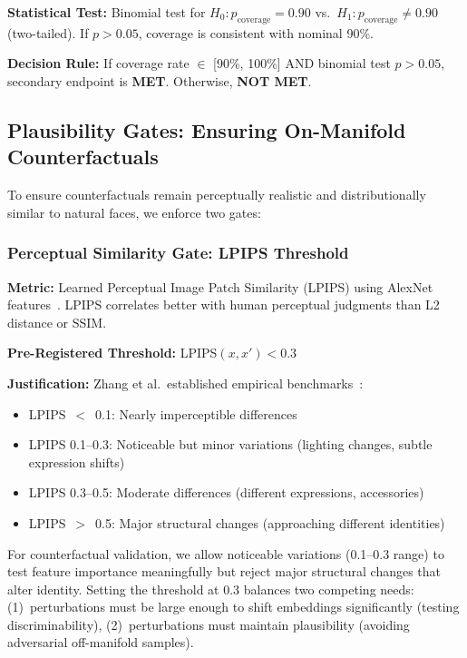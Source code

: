 \textbf{Statistical Test:} Binomial test for $H_0: p_{\text{coverage}} = 0.90$ vs.\ $H_1: p_{\text{coverage}} \neq 0.90$ (two-tailed). If $p > 0.05$, coverage is consistent with nominal 90\%.

\textbf{Decision Rule:} If coverage rate $\in$ [90\%, 100\%] AND binomial test $p > 0.05$, secondary endpoint is \textbf{MET}. Otherwise, \textbf{NOT MET}.

\subsection{Plausibility Gates: Ensuring On-Manifold Counterfactuals}

To ensure counterfactuals remain perceptually realistic and distributionally similar to natural faces, we enforce two gates:

\subsubsection{Perceptual Similarity Gate: LPIPS Threshold}

\textbf{Metric:} Learned Perceptual Image Patch Similarity (LPIPS) using AlexNet features~\cite{zhang2018perceptual}. LPIPS correlates better with human perceptual judgments than L2 distance or SSIM.

\textbf{Pre-Registered Threshold:} LPIPS$(x, x') < 0.3$

\textbf{Justification:} Zhang et al.\ established empirical benchmarks~\cite{zhang2018perceptual}:
\begin{itemize}
\item LPIPS~$<$~0.1: Nearly imperceptible differences
\item LPIPS 0.1--0.3: Noticeable but minor variations (lighting changes, subtle expression shifts)
\item LPIPS 0.3--0.5: Moderate differences (different expressions, accessories)
\item LPIPS~$>$~0.5: Major structural changes (approaching different identities)
\end{itemize}

For counterfactual validation, we allow noticeable variations (0.1--0.3 range) to test feature importance meaningfully but reject major structural changes that alter identity. Setting the threshold at 0.3 balances two competing needs: (1)~perturbations must be large enough to shift embeddings significantly (testing discriminability), (2)~perturbations must maintain plausibility (avoiding adversarial off-manifold samples).

